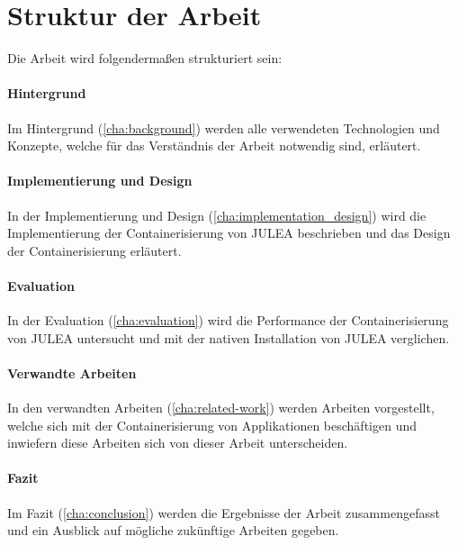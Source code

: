 \section{Struktur der Arbeit}

Die Arbeit wird folgendermaßen strukturiert sein:

\paragraph{Hintergrund}

Im Hintergrund (\cref{cha:background}) werden alle verwendeten Technologien und Konzepte, welche für das Verständnis der Arbeit notwendig sind, erläutert.

\paragraph{Implementierung und Design}

In der Implementierung und Design (\cref{cha:implementation_design}) wird die Implementierung der Containerisierung von JULEA beschrieben und das Design der Containerisierung erläutert.

\paragraph{Evaluation}

In der Evaluation (\cref{cha:evaluation}) wird die Performance der Containerisierung von JULEA untersucht und mit der nativen Installation von JULEA verglichen.

\paragraph{Verwandte Arbeiten}

In den verwandten Arbeiten (\cref{cha:related-work}) werden Arbeiten vorgestellt, welche sich mit der Containerisierung von Applikationen beschäftigen und inwiefern diese Arbeiten sich von dieser Arbeit unterscheiden.

\paragraph{Fazit}

Im Fazit (\cref{cha:conclusion}) werden die Ergebnisse der Arbeit zusammengefasst und ein Ausblick auf mögliche zukünftige Arbeiten gegeben.

